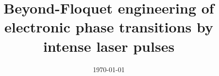 \documentclass[12pt,a4paper]{article}
\begin{document}
\title{Beyond-Floquet engineering of electronic phase transitions by intense laser pulses}
\date{\today}
\maketitle

\clearpage


\end{document}
